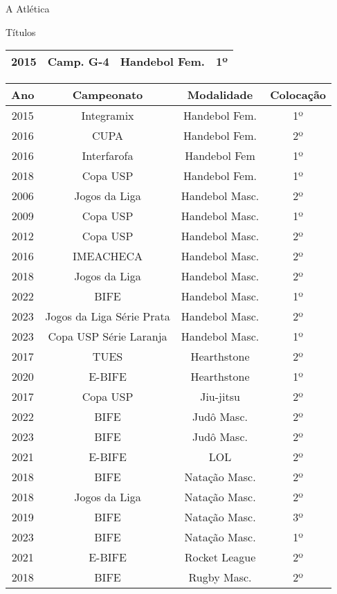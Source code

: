 \begin{secao}{A Atlética}
\begin{subsecao}{Títulos}
\begin{center}
\begin{tabular}{|c|c|c|c|}
    2015 & Camp. G-4      & Handebol Fem.   & 1º\\
    \hline
         \end{tabular}
\end{center}
\begin{center}
\begin{tabular}{|c|c|c|c|}
  \hline
  Ano & Campeonato & Modalidade & Colocação\\
  \hline
    2015 & Integramix     & Handebol Fem.   & 1º\\
    2016 & CUPA           & Handebol Fem.   & 2º\\
    2016 & Interfarofa    & Handebol Fem    & 1º\\
    2018 & Copa USP       & Handebol Fem.   & 1º\\
    2006 & Jogos da Liga  & Handebol Masc.  & 2º\\
    2009 & Copa USP       & Handebol Masc.  & 1º\\
    2012 & Copa USP       & Handebol Masc.  & 2º\\
    2016 & IMEACHECA      & Handebol Masc.  & 2º\\
    2018 & Jogos da Liga  & Handebol Masc.  & 2º\\
    2022 & BIFE           & Handebol Masc.  & 1º\\
    2023 & Jogos da Liga Série Prata & Handebol Masc. & 2º\\
    2023 & Copa USP Série Laranja & Handebol Masc.  & 1º\\
    2017 & TUES           & Hearthstone     & 2º\\
    2020 & E-BIFE         & Hearthstone     & 1º\\
    2017 & Copa USP       & Jiu-jitsu       & 2º\\
    2022 & BIFE           & Judô Masc.      & 2º\\
    2023 & BIFE           & Judô Masc.      & 2º\\
    2021 & E-BIFE         & LOL             & 2º\\
    2018 & BIFE           & Natação Masc.   & 2º\\
    2018 & Jogos da Liga  & Natação Masc.   & 2º\\
    2019 & BIFE           & Natação Masc.   & 3º\\
    2023 & BIFE           & Natação Masc.   & 1º\\
    2021 & E-BIFE         & Rocket League   & 2º\\
    2018 & BIFE           & Rugby Masc.     & 2º\\

\end{tabular}
\end{center}
\end{subsecao}
\end{secao}
